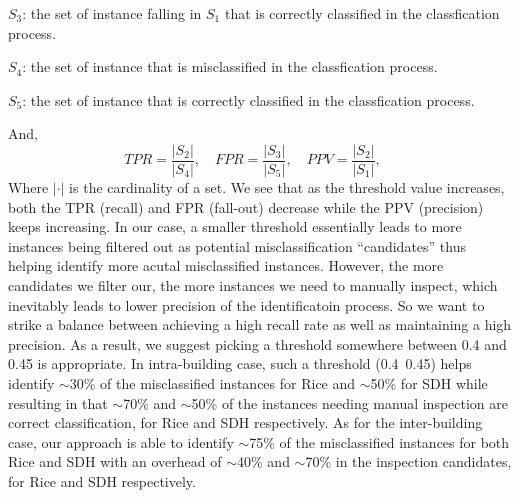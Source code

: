 $S_{3}$: the set of instance falling in $S_{1}$ that is correctly classified in the classfication process.

$S_{4}$: the set of instance that is misclassified in the classfication process.

$S_{5}$: the set of instance that is correctly classified in the classfication process.

And, 
\begin{displaymath}
TPR = \frac{|S_{2}|}{|S_{4}|},\quad
FPR = \frac{|S_{3}|}{|S_{5}|},\quad
PPV = \frac{|S_{2}|}{|S_{1}|},\quad
\end{displaymath}
Where $|\cdot|$ is the cardinality of a set. We see that as the threshold value increases, both the TPR (recall) and FPR (fall-out) decrease while the PPV (precision) keeps increasing. In our case, a smaller threshold essentially leads to more instances being filtered out as potential misclassification ``candidates'' thus helping identify more acutal misclassified instances. However, the more candidates we filter our, the more instances we need to manually inspect,
which inevitably leads to lower precision of the identificatoin process. So we want to strike a balance between achieving a high recall rate as well as maintaining a high precision. As a result, we suggest picking a threshold somewhere between 0.4 and 0.45 is appropriate. In intra-building case, such a threshold (0.4~0.45) helps identify $\sim$30\% of the misclassified instances for Rice and $\sim$50\% for SDH while resulting in that $\sim$70\% and $\sim$50\% of the instances
needing manual inspection are correct classification, for Rice and SDH respectively. As for the inter-building case, our approach is able to identify $\sim$75\% of the misclassified instances for both Rice and SDH with an overhead of $\sim$40\% and $\sim$70\% in the inspection candidates, for Rice and SDH respectively.

